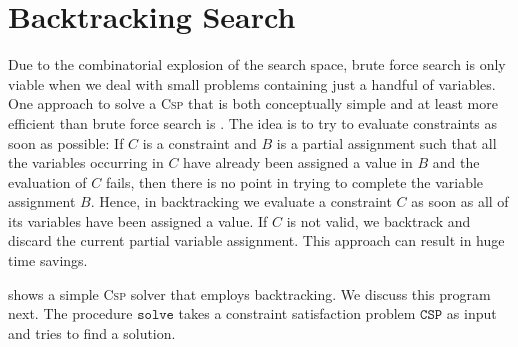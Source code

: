 \section{Backtracking Search}
Due to the combinatorial explosion of the search space, brute force search is only viable when we deal with
small problems containing just a handful of variables.  One approach to solve a \textsc{Csp} that is both
conceptually simple and at least more efficient than brute force search is .  The idea is to
try to evaluate constraints as soon as possible:  If $C$ is a constraint and $B$ is a partial assignment such
that all the variables occurring in $C$ have already been assigned a value in $B$ and the evaluation of $C$
fails, then there is no point in trying to complete the variable assignment $B$.  Hence, in backtracking we
evaluate a constraint $C$ as soon as all of its variables have been assigned a value.  If $C$ is not valid, we
backtrack and discard the current partial variable assignment.  This approach can result in huge time savings.

 shows a simple \textsc{Csp} solver 
that employs backtracking.  We discuss this program next.  The procedure $\texttt{solve}$ takes a constraint
satisfaction problem $\texttt{CSP}$ as input and tries to find a solution.  


